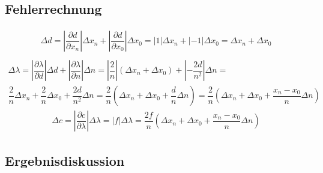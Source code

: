 \documentclass{scrartcl}
\begin{document}
\subsection{Fehlerrechnung}
\begin{align*}
\Delta d = \left| \dfrac{\partial d}{\partial x_{n}} \right| \Delta x_{n} + \left| \dfrac{\partial d}{\partial x_{0}} \right| \Delta x_{0} = \left| 1 \right| \Delta x_{n} + \left| -1 \right| \Delta x_{0} = \Delta x_{n} + \Delta x_{0} \\
\end{align*}
\begin{align*}
\Delta \lambda = \left| \dfrac{\partial \lambda}{\partial d} \right| \Delta d + \left| \dfrac{\partial \lambda}{\partial n} \right| \Delta n = \left| \dfrac{2}{n} \right| (\Delta x_{n} + \Delta x_{0}) + \left| - \dfrac{2d}{n^2} \right| \Delta n = \\
\dfrac{2}{n} \Delta x_{n} + \dfrac{2}{n} \Delta x_{0} + \dfrac{2d}{n^2} \Delta n = \dfrac{2}{n} (\Delta x_{n} + \Delta x_{0} + \dfrac{d}{n} \Delta n) = \dfrac{2}{n} (\Delta x_{n} + \Delta x_{0} + \dfrac{x_{n} - x_{0}}{n} \Delta n)
\end{align*}
\begin{align*}
\Delta c = \left| \dfrac{\partial c}{\partial \lambda} \right| \Delta \lambda = \left| f \right| \Delta \lambda = \dfrac{2f}{n} (\Delta x_{n} + \Delta x_{0} + \dfrac{x_{n} - x_{0}}{n} \Delta n)
\end{align*}
\subsection{Ergebnisdiskussion}
\end{document}
